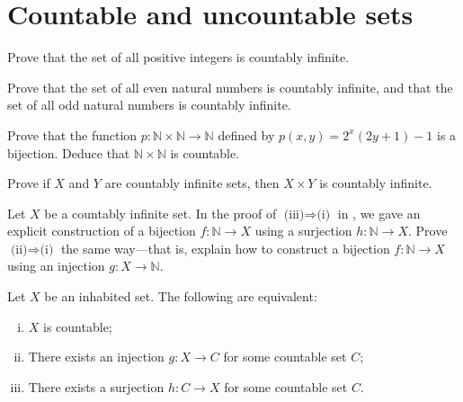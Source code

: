 \section{Countable and uncountable sets}


\begin{exercise}
\label{exPositiveIntegersCountablyInfinite}
Prove that the set of all positive integers is countably infinite.
\end{exercise}

\begin{exercise}
\label{exEvenOddNaturalNumbersCountablyInfinite}
Prove that the set of all even natural numbers is countably infinite, and that the set of all odd natural numbers is countably infinite.
\end{exercise}

\begin{exercise}
Prove that the function $p : \mathbb{N} \times \mathbb{N} \to \mathbb{N}$ defined by $p(x,y) = 2^x(2y+1)-1$ is a bijection. Deduce that $\mathbb{N} \times \mathbb{N}$ is countable.
\end{exercise}


\begin{exercise}
Prove if $X$ and $Y$ are countably infinite sets, then $X \times Y$ is countably infinite.
\end{exercise}


\begin{exercise}
Let $X$ be a countably infinite set. In the proof of $\text{(iii)} \Rightarrow \text{(i)}$ in , we gave an explicit construction of a bijection $f : \mathbb{N} \to X$ using a surjection $h : \mathbb{N} \to X$. Prove $\text{(ii)} \Rightarrow \text{(i)}$ the same way---that is, explain how to construct a bijection $f : \mathbb{N} \to X$ using an injection $g : X \to \mathbb{N}$.
\end{exercise}

\begin{exercise}
\label{exCountabilityFromInjectionsAndSurjections}
Let $X$ be an inhabited set. The following are equivalent:
\begin{enumerate}[(i)]
\item \label{itmInjectionSurjectionCountableSets} $X$ is countable;
\item \label{itmInjectionIntoCountableSet} There exists an injection $g : X \to C$ for some countable set $C$;
\item \label{itmSurjectionFromCountableSet} There exists a surjection $h : C \to X$ for some countable set $C$.
\end{enumerate}
\end{exercise}

